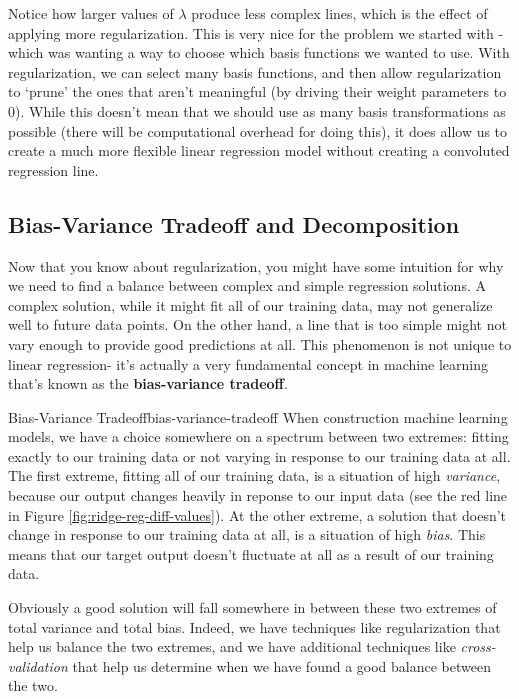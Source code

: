 Notice how larger values of $\lambda$ produce less complex lines, which is the effect of applying more regularization. This is very nice for the problem we started with - which was wanting a way to choose which basis functions we wanted to use. With regularization, we can select many basis functions, and then allow regularization to `prune' the ones that aren't meaningful (by driving their weight parameters to 0). While this doesn't mean that we should use as many basis transformations as possible (there will be computational overhead for doing this), it does allow us to create a much more flexible linear regression model without creating a convoluted regression line.

\subsection{Bias-Variance Tradeoff and Decomposition}
Now that you know about regularization, you might have some intuition for why we need to find a balance between complex and simple regression solutions. A complex solution, while it might fit all of our training data, may not generalize well to future data points. On the other hand, a line that is too simple might not vary enough to provide good predictions at all. This phenomenon is not unique to linear regression- it's actually a very fundamental concept in machine learning that's known as the \textbf{bias-variance tradeoff}.

\begin{definition}{Bias-Variance Tradeoff}{bias-variance-tradeoff}
    When construction machine learning models, we have a choice somewhere on a spectrum between two extremes: fitting exactly to our training data or not varying in response to our training data at all. The first extreme, fitting all of our training data, is a situation of high \textit{variance}, because our output changes heavily in reponse to our input data (see the red line in Figure \ref{fig:ridge-reg-diff-values}). At the other extreme, a solution that doesn't change in response to our training data at all, is a situation of high \textit{bias}. This means that our target output doesn't fluctuate at all as a result of our training data.
\end{definition}

Obviously a good solution will fall somewhere in between these two extremes of total variance and total bias. Indeed, we have techniques like regularization that help us balance the two extremes, and we have additional techniques like \textit{cross-validation} that help us determine when we have found a good balance between the two.

